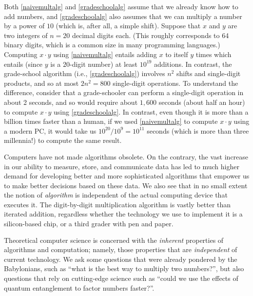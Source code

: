 Both \cref{naivemultalg} and \cref{gradeschoolalg} assume that we
already know how to add numbers, and \cref{gradeschoolalg} also assumes
that we can multiply a number by a power of \(10\) (which is, after all,
a simple shift). Suppose that \(x\) and \(y\) are two integers of
\(n=20\) decimal digits each. (This roughly corresponds to 64 binary
digits, which is a common size in many programming languages.) Computing
\(x \cdot y\) using \cref{naivemultalg} entails adding \(x\) to itself
\(y\) times which entails (since \(y\) is a \(20\)-digit number) at
least \(10^{19}\) additions. In contrast, the grade-school algorithm
(i.e., \cref{gradeschoolalg}) involves \(n^2\) shifts and single-digit
products, and so at most \(2n^2 = 800\) single-digit operations. To
understand the difference, consider that a grade-schooler can perform a
single-digit operation in about 2 seconds, and so would require about
\(1,600\) seconds (about half an hour) to compute \(x\cdot y\) using
\cref{gradeschoolalg}. In contrast, even though it is more than a
billion times faster than a human, if we used \cref{naivemultalg} to
compute \(x\cdot y\) using a modern PC, it would take us
\(10^{20}/10^9 = 10^{11}\) seconds (which is more than three millennia!)
to compute the same result.

Computers have not made algorithms obsolete. On the contrary, the vast
increase in our ability to measure, store, and communicate data has led
to much higher demand for developing better and more sophisticated
algorithms that empower us to make better decisions based on these data.
We also see that in no small extent the notion of \emph{algorithm} is
independent of the actual computing device that executes it. The
digit-by-digit multiplication algorithm is vastly better than iterated
addition, regardless whether the technology we use to implement it is a
silicon-based chip, or a third grader with pen and paper.

Theoretical computer science is concerned with the \emph{inherent}
properties of algorithms and computation; namely, those properties that
are \emph{independent} of current technology. We ask some questions that
were already pondered by the Babylonians, such as ``what is the best way
to multiply two numbers?'', but also questions that rely on cutting-edge
science such as ``could we use the effects of quantum entanglement to
factor numbers faster?''.


